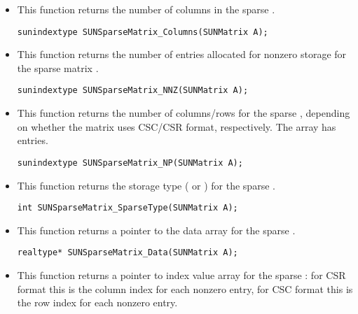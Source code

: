 \begin{itemize}
\item {}

  This function returns the number of columns in the sparse .
 
  \verb|sunindextype SUNSparseMatrix_Columns(SUNMatrix A);|


\item {}

  This function returns the number of entries allocated for nonzero
  storage for  the sparse matrix .
 
  \verb|sunindextype SUNSparseMatrix_NNZ(SUNMatrix A);|


\item {}

  This function returns the number of columns/rows for the
  sparse , depending on whether the matrix uses CSC/CSR
  format, respectively.  The  array has  entries.
 
  \verb|sunindextype SUNSparseMatrix_NP(SUNMatrix A);|


\item {}

  This function returns the storage type (
  or ) for the sparse .
 
  \verb|int SUNSparseMatrix_SparseType(SUNMatrix A);|


\item {}

  This function returns a pointer to the data array for the
  sparse . 
 
  \verb|realtype* SUNSparseMatrix_Data(SUNMatrix A);|


\item {}

  This function returns a pointer to index value array for the sparse
  : for CSR format this is the column index for each nonzero
  entry, for CSC format this is the row index for each nonzero entry.
 

\end{itemize}
